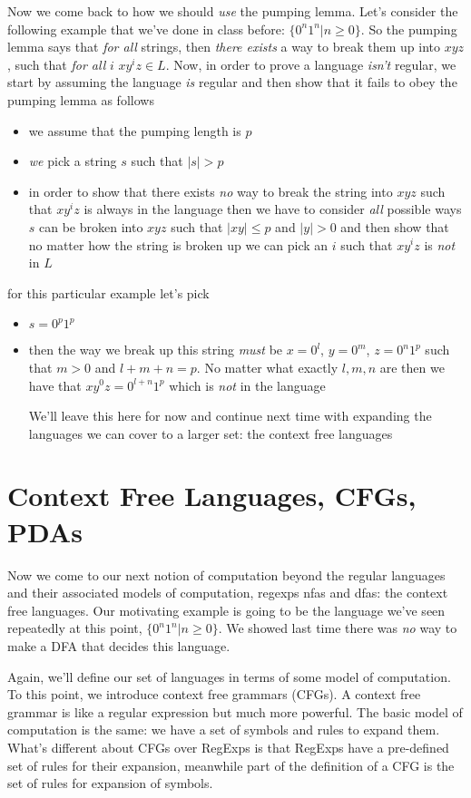 \documentclass[11pt]{article}
\begin{document}
Now we come back to how we should \emph{use} the pumping lemma. Let's consider the following example that we've done in class before: $\{0^n1^n | n \geq 0\}$. So the pumping lemma says that \emph{for all} strings, then \emph{there exists} a way to break them up into $xyz$, such that \emph{for all} $i$ $xy^iz \in L$. Now, in order to prove a language \emph{isn't} regular, we start by assuming the language \emph{is} regular and then show that it fails to obey the pumping lemma as follows

\begin{itemize}
\item we assume that the pumping length is $p$
\item \emph{we} pick a string $s$ such that $|s| > p$
\item in order to show that there exists \emph{no} way to break the string into $xyz$ such that $xy^iz$ is always in the language then we have to consider \emph{all} possible ways $s$ can be broken into $xyz$ such that $|xy| \le p$ and $|y| > 0$ and then show that no matter how the string is broken up we can pick an $i$ such that $xy^iz$ is \emph{not} in $L$
\end{itemize}

for this particular example let's pick
\begin{itemize}
\item $s = 0^p1^p$
\item then the way we break up this string \emph{must} be $x=0^l$, $y=0^m$, $z=0^n1^p$ such that $m > 0$ and $l + m + n = p$. No matter what exactly $l,m,n$ are then we have that $xy^0z = 0^{l+n}1^p$ which is \emph{not} in the language

We'll leave this here for now and continue next time with expanding the languages we can cover to a larger set: the context free languages
\end{itemize}
\section{Context Free Languages, CFGs, PDAs}
\label{sec-7}
Now we come to our next notion of computation beyond the regular languages and their associated models of computation, regexps nfas and dfas: the context free languages. Our motivating example is going to be the language we've seen repeatedly at this point, $\{0^n1^n | n \geq 0\}$. We showed last time there was \emph{no} way to make a DFA that decides this language.

Again, we'll define our set of languages in terms of some model of computation. To this point, we introduce context free grammars (CFGs). A context free grammar is like a regular expression but much more powerful. The basic model of computation is the same: we have a set of symbols and rules to expand them. What's different about CFGs over RegExps is that RegExps have a pre-defined set of rules for their expansion, meanwhile part of the definition of a CFG is the set of rules for expansion of symbols. 
\end{document}
